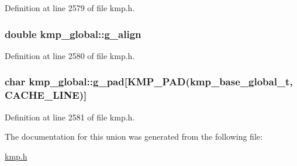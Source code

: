 Definition at line 2579 of file kmp.\-h.

\hypertarget{unionkmp__global_a438f9e2a578361527edbb0d9c4dbc9f7}{
\subsubsection[{g\-\_\-align}]{\setlength{\rightskip}{0pt plus 5cm}double kmp\-\_\-global\-::g\-\_\-align}}\label{unionkmp__global_a438f9e2a578361527edbb0d9c4dbc9f7}


Definition at line 2580 of file kmp.\-h.

\hypertarget{unionkmp__global_a264fc6cbbde29a63dff78ebcc602c068}{
\subsubsection[{g\-\_\-pad}]{\setlength{\rightskip}{0pt plus 5cm}char kmp\-\_\-global\-::g\-\_\-pad\mbox{[}{\bf K\-M\-P\-\_\-\-P\-A\-D}({\bf kmp\-\_\-base\-\_\-global\-\_\-t}, {\bf C\-A\-C\-H\-E\-\_\-\-L\-I\-N\-E})\mbox{]}}}\label{unionkmp__global_a264fc6cbbde29a63dff78ebcc602c068}


Definition at line 2581 of file kmp.\-h.



The documentation for this union was generated from the following file\-:\begin{DoxyCompactItemize}
\item 
\hyperlink{kmp_8h}{kmp.\-h}\end{DoxyCompactItemize}
